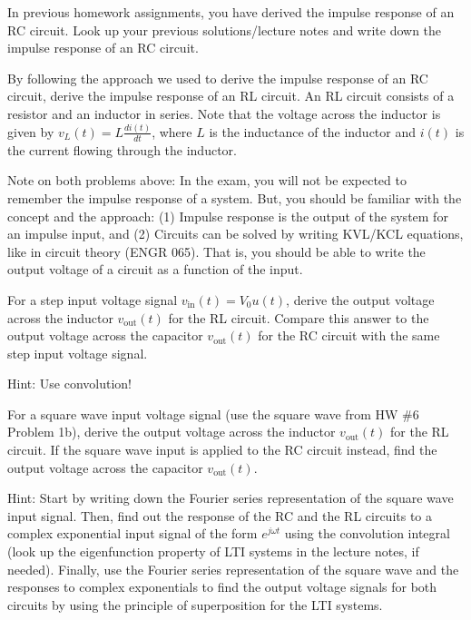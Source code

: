 \documentclass{ee102_pset}
\author{\rule{3cm}{0.4pt}} %
\begin{document}

\problempart [5 points] In previous homework assignments, you have derived the impulse response of an RC circuit. Look up your previous solutions/lecture notes and write down the impulse response of an RC circuit.



\problempart [20 points] By following the approach we used to derive the impulse response of an RC circuit, derive the impulse response of an RL circuit. An RL circuit consists of a resistor and an inductor in series. Note that the voltage across the inductor is given by $v_L(t) = L \frac{di(t)}{dt}$, where $L$ is the inductance of the inductor and $i(t)$ is the current flowing through the inductor.

{\color{blue} Note on both problems above: In the exam, you will not be expected to remember the impulse response of a system. But, you should be familiar with the concept and the approach: (1) Impulse response is the output of the system for an impulse input, and (2) Circuits can be solved by writing KVL/KCL equations, like in circuit theory (ENGR 065). That is, you should be able to write the output voltage of a circuit as a function of the input.}

\problempart [20 points] For a step input voltage signal $v_{\text{in}}(t) = V_0 u(t)$, derive the output voltage across the inductor $v_{\text{out}}(t)$ for the RL circuit. Compare this answer to the output voltage across the capacitor $v_{\text{out}}(t)$ for the RC circuit with the same step input voltage signal.

{\color{blue} Hint: Use convolution!}

\problempart [25 points] For a square wave input voltage signal (use the square wave from HW \#6 Problem 1b), derive the output voltage across the inductor $v_{\text{out}}(t)$ for the RL circuit. If the square wave input is applied to the RC circuit instead, find the output voltage across the capacitor $v_{\text{out}}(t)$.

{\color{blue} Hint: Start by writing down the Fourier series representation of the square wave input signal. Then, find out the response of the RC and the RL circuits to a complex exponential input signal of the form $e^{j \omega t}$ using the convolution integral (look up the eigenfunction property of LTI systems in the lecture notes, if needed). Finally, use the Fourier series representation of the square wave and the responses to complex exponentials to find the output voltage signals for both circuits by using the principle of superposition for the LTI systems.}
\end{document}
